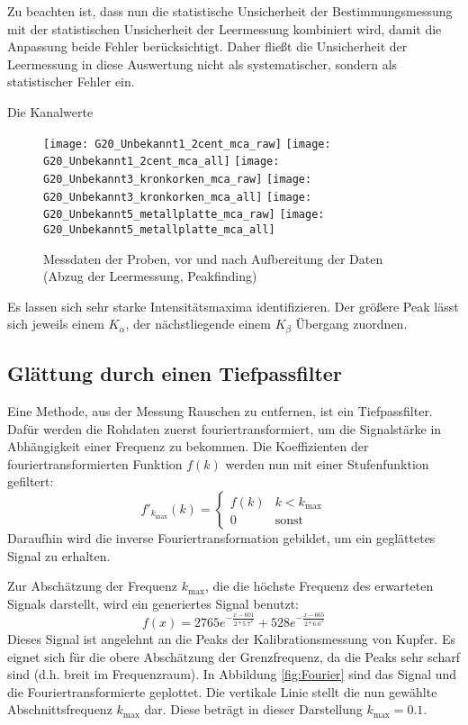 \documentclass{../Misc/MontavonLaTeX/Montavon}
\newcommand{\halfwidth}{0.48\textwidth}
\begin{document}
Zu beachten ist, dass nun die statistische Unsicherheit der Bestimmungsmessung mit der statistischen Unsicherheit der Leermessung kombiniert wird, damit die Anpassung beide Fehler berücksichtigt. Daher fließt die Unsicherheit der Leermessung in diese Auswertung nicht als systematischer, sondern als statistischer Fehler ein.

Die Kanalwerte 


\begin{figure}[h]
\centering
\texttt{[image: G20\_Unbekannt1\_2cent\_mca\_raw]}
\texttt{[image: G20\_Unbekannt1\_2cent\_mca\_all]}
\texttt{[image: G20\_Unbekannt3\_kronkorken\_mca\_raw]}
\texttt{[image: G20\_Unbekannt3\_kronkorken\_mca\_all]}
\texttt{[image: G20\_Unbekannt5\_metallplatte\_mca\_raw]}
\texttt{[image: G20\_Unbekannt5\_metallplatte\_mca\_all]}
\caption{Messdaten der Proben, vor und nach Aufbereitung der Daten (Abzug der Leermessung, Peakfinding)}
\label{fig:Unbekannte}
\end{figure}


Es lassen sich sehr starke Intensitätsmaxima identifizieren. Der größere
Peak lässt sich jeweils einem $K_{\alpha}$, der nächstliegende einem
$K_{\beta}$ Übergang zuordnen.


\subsection{Glättung durch einen Tiefpassfilter}
Eine Methode, aus der Messung Rauschen zu entfernen, ist ein Tiefpassfilter. Dafür werden die Rohdaten zuerst fouriertransformiert, um die Signalstärke in Abhängigkeit einer Frequenz zu bekommen.
Die Koeffizienten der fouriertransformierten Funktion $f(k)$ werden nun mit einer Stufenfunktion gefiltert:
\[
	f'_{k_\textrm{max}}(k) = \begin{cases} f(k) & k < k_\textrm{max} \\ 0 & \textrm{sonst} \end{cases}
\]
Daraufhin wird die inverse Fouriertransformation gebildet, um ein geglättetes Signal zu erhalten.

Zur Abschätzung der Frequenz $k_\textrm{max}$, die die höchste Frequenz des erwarteten Signals darstellt, wird ein generiertes Signal benutzt:
\[
	f(x) = 2765 e^{-\frac{x - 601}{2 * 5.7^2}} + 528 e^{-\frac{x - 665}{2 * 6.0^2}}
\]
Dieses Signal ist angelehnt an die Peaks der Kalibrationsmessung von Kupfer. Es eignet sich für die obere Abschätzung der Grenzfrequenz, da die Peaks sehr scharf sind (d.h. breit im Frequenzraum).
In Abbildung \ref{fig:Fourier} sind das Signal und die Fouriertransformierte geplottet. Die vertikale Linie stellt die nun gewählte Abschnittsfrequenz $k_\textrm{max}$ dar. Diese beträgt in dieser Darstellung $k_\textrm{max} = 0.1$.
\end{document}
